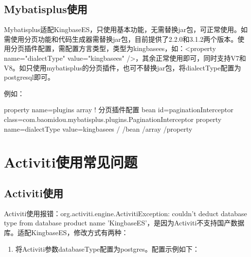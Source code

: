 \documentclass[letterpaper,10pt,english]{sphinxmanual}
\begin{document}
\subsection{Mybatis\sphinxhyphen{}plus使用}
\label{\detokenize{interface/mybatis-plus:id1}}
Mybatis\sphinxhyphen{}plus适配KingbaseES，只使用基本功能，无需替换jar包，可正常使用。如需使用分页功能和代码生成器需替换jar包，目前提供了2.2.0和3.1.2两个版本。使用分页插件配置，需配置方言类型，类型为kingbasees，如：<property name="dialectType" value="kingbasees" />，其余正常使用即可，同时支持V7和V8。如只使用mybatis\sphinxhyphen{}plus的分页插件，也可不替换jar包，将dialectType配置为postgresql即可。

例如：

\begin{sphinxVerbatim}[commandchars=\\\{\}]
\PYGZlt{}property name=\PYGZdq{}plugins\PYGZdq{}\PYGZgt{}
         \PYGZlt{}array\PYGZgt{}
                   \PYGZlt{}!\PYGZhy{}\PYGZhy{} 分页插件配置 \PYGZhy{}\PYGZhy{}\PYGZgt{}
                   \PYGZlt{}bean id=\PYGZdq{}paginationInterceptor\PYGZdq{}
                                              class=\PYGZdq{}com.baomidou.mybatisplus.plugins.PaginationInterceptor\PYGZdq{}\PYGZgt{}
                            \PYGZlt{}property name=\PYGZdq{}dialectType\PYGZdq{} value=\PYGZdq{}kingbasees\PYGZdq{} /\PYGZgt{}
                   \PYGZlt{}/bean\PYGZgt{}
         \PYGZlt{}/array\PYGZgt{}
\PYGZlt{}/property\PYGZgt{}
\end{sphinxVerbatim}


\section{Activiti使用常见问题}
\label{\detokenize{interface/activiti:activiti}}\label{\detokenize{interface/activiti::doc}}

\subsection{Activiti使用}
\label{\detokenize{interface/activiti:id1}}
Activiti使用报错：org.activiti.engine.ActivitiException: couldn't deduct database type from database product name 'KingbaseES'，是因为Activiti不支持国产数据库。适配KingbaseES，修改方式有两种：
\begin{enumerate}
%
\item {} 
将Activiti参数databaseType配置为postgres。配置示例如下：

\end{enumerate}
\end{document}

